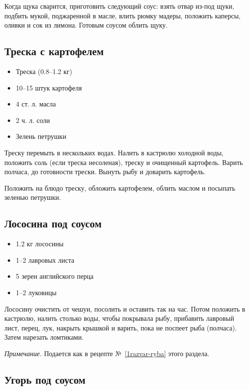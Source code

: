 Когда щука сварится, приготовить следующий соус: взять отвар из-под щуки, подбить мукой, поджаренной в масле, влить рюмку мадеры, положить каперсы, оливки и сок из лимона. Готовым соусом облить щуку.

\subsection{Треска с картофелем}

\begin{itemize}
	\item Треска (0.8–1.2 кг) 
    \item 10–15 штук картофеля
    \item 4 ст. л. масла 
    \item 2 ч. л. соли 
    \item Зелень петрушки
\end{itemize}

Треску перемыть в нескольких водах. Налить в кастрюлю холодной воды, положить соль (если треска несоленая), треску и очищенный картофель. Варить полчаса, до готовности трески. Вынуть рыбу и доварить картофель.

Положить на блюдо треску, обложить картофелем, облить маслом и посыпать зеленью петрушки.

\subsection{Лососина под соусом}

\begin{itemize}
	\item 1.2 кг лососины 
    \item 1–2 лавровых листа
    \item 5 зерен английского перца 
    \item 1–2 луковицы
\end{itemize}

Лососину очистить от чешуи, посолить и оставить так на час. Потом положить в кастрюлю, налить столько воды, чтобы покрывала рыбу, прибавить лавровый лист, перец, лук, накрыть крышкой и варить, пока не поспеет рыба (полчаса). Затем нарезать ломтиками.

\emph{Примечание.} Подается как в рецепте №~\ref{1razvar-ryba} этого раздела.

\subsection{Угорь под соусом}

